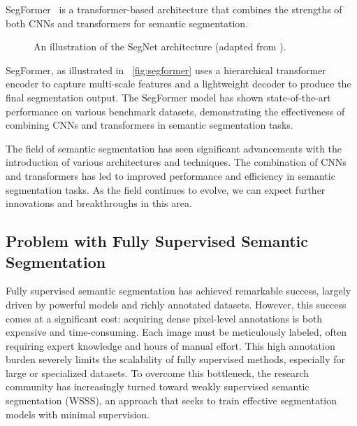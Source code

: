 SegFormer~\cite{fsss_segformer} is a transformer-based architecture that combines the strengths of both CNNs and transformers for semantic segmentation. 
\begin{figure}[htbp]
    \centering
    \caption{An illustration of the SegNet architecture (adapted from \cite{fsss_segformer}).}
    \label{fig:segformer}
\end{figure}
SegFormer, as illustrated in ~\autoref{fig:segformer} uses a hierarchical transformer encoder to capture multi-scale features and a lightweight decoder to produce the final segmentation output. The SegFormer model has shown state-of-the-art performance on various benchmark datasets, demonstrating the effectiveness of combining CNNs and transformers in semantic segmentation tasks.

The field of semantic segmentation has seen significant advancements with the introduction of various architectures and techniques. The combination of CNNs and transformers has led to improved performance and efficiency in semantic segmentation tasks. As the field continues to evolve, we can expect further innovations and breakthroughs in this area.

\subsection{Problem with Fully Supervised Semantic Segmentation}
\label{subsec:problem-with-fully-supervised}
Fully supervised semantic segmentation has achieved remarkable success, largely driven by powerful models and richly annotated datasets. However, this success comes at a significant cost: acquiring dense pixel-level annotations is both expensive and time-consuming. Each image must be meticulously labeled, often requiring expert knowledge and hours of manual effort. This high annotation burden severely limits the scalability of fully supervised methods, especially for large or specialized datasets. To overcome this bottleneck, the research community has increasingly turned toward weakly supervised semantic segmentation (WSSS), an approach that seeks to train effective segmentation models with minimal supervision.

